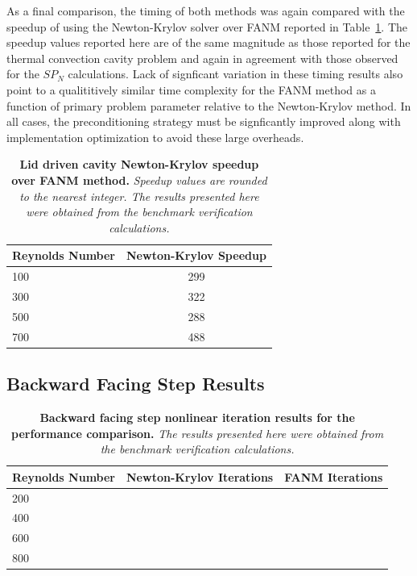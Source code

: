 As a final comparison, the timing of both methods was again compared
with the speedup of using the Newton-Krylov solver over FANM reported
in Table~\ref{tab:driven_speedup_comparison}. The speedup values
reported here are of the same magnitude as those reported for the
thermal convection cavity problem and again in agreement with those
observed for the $SP_N$ calculations. Lack of signficant variation in
these timing results also point to a qualititively similar time
complexity for the FANM method as a function of primary problem
parameter relative to the Newton-Krylov method. In all cases, the
preconditioning strategy must be signficantly improved along with
implementation optimization to avoid these large overheads.

\begin{table}[h!]
  \begin{center}
    \begin{tabular}{lc}\hline\hline
      \multicolumn{1}{l}{Reynolds Number}& 
      \multicolumn{1}{c}{Newton-Krylov Speedup}\\
      \hline
      100 & 299 \\
      300 & 322 \\
      500 & 288 \\
      700 & 488 \\
      \hline\hline
    \end{tabular}
  \end{center}
  \caption{\textbf{Lid driven cavity Newton-Krylov speedup over FANM
      method.} \textit{Speedup values are rounded to the nearest
      integer. The results presented here were obtained from the
      benchmark verification calculations.}}
  \label{tab:driven_speedup_comparison}
\end{table}

\clearpage

\subsection{Backward Facing Step Results}
\label{subsec:backward_step_comparison}

\begin{table}[h!]
  \begin{center}
    \begin{tabular}{lcc}\hline\hline
      \multicolumn{1}{l}{Reynolds Number}& 
      \multicolumn{1}{c}{Newton-Krylov Iterations}&
      \multicolumn{1}{c}{FANM Iterations}\\
      \hline
      200 & \\
      400 & \\
      600 & \\
      800 & \\
      \hline\hline
    \end{tabular}
  \end{center}
  \caption{\textbf{Backward facing step nonlinear iteration
      results for the performance comparison.} \textit{The results
      presented here were obtained from the benchmark verification
      calculations.}}
  \label{tab:step_nonlinear_iter_comparison}
\end{table}

